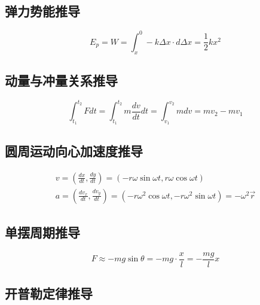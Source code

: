 \subsection{弹力势能推导}

\begin{equation*}
    E_p=W=\int_{x}^0-k\Delta x\cdot d\Delta x=\frac12kx^2
\end{equation*}

\subsection{动量与冲量关系推导}

\begin{equation*}
    \int_{t_1}^{t_2}Fdt
    =\int_{t_1}^{t_2}m\frac{dv}{dt}dt
    =\int_{v_1}^{v_2}mdv
    =mv_2-mv_1
\end{equation*}

\subsection{圆周运动向心加速度推导}

\begin{gather*}
    v=\left(\frac{dx}{dt},\frac{dy}{dt}\right)
    =(-r\omega\sin\omega t,r\omega\cos\omega t)\\
    a=\left(\frac{dv_x}{dt},\frac{dv_y}{dt}\right)
    =(-r\omega^2\cos\omega t,-r\omega^2\sin\omega t)
    =-\omega^2\vec{r}
\end{gather*}

\subsection{单摆周期推导}

\begin{equation*}
    F\approx -mg\sin\theta=-mg\cdot\frac{x}{l}=-\frac{mg}{l}x
\end{equation*}

\subsection{开普勒定律推导}

